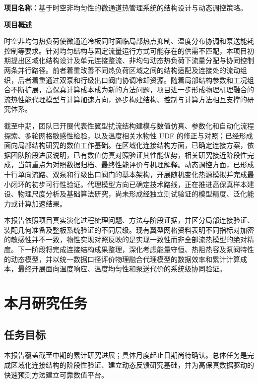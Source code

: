 \documentclass[stage2,UTF8,fontset=fandol]{ydzjreport}
\begin{document}
\makestagetwohead
\begin{keybox}
\textbf{项目名称：}基于时空非均匀性的微通道热管理系统的结构设计与动态调控策略。
\end{keybox}

\par\medskip
\noindent\textbf{项目概述}\par
时空非均匀热负荷使微通道冷板同时面临局部热点抑制、温度分布协调和泵送能耗控制等要求。针对均匀结构与固定流量运行方式可能存在的供需不匹配，本项目初期提出区域化结构设计及单元连接整流、非均匀动态热负荷下流量分配与协同控制两条并行路径。前者着重改善不同热负荷区域之间的结构适配及连接处的流动组织，后者着重通过双泵和行级出口阀门协调冷却资源。随着局部结构参数和工况组合不断扩展，高保真计算成本成为新的方法问题，项目进一步形成物理机理融合的流热性能代理模型与计算加速方向，逐步构建结构、控制与计算方法相互支撑的研究体系。

截至中期，团队已开展代表性翼型扰流结构建模与数值仿真、参数化和自动化流程探索、多轮网格敏感性检验，以及温度相关水物性 UDF 的修正与对照；已经形成面向局部结构研究的数值工作基础。在区域化连接结构方面，已确定连接方案，依据团队阶段进展说明，已有数值仿真对照验证其性能优势，相关研究接近阶段性完成，当前重点为对照数据归档、最终性能评价与机理解释。动态调控方面，已形成十行单向流路、双泵和行级出口阀门的基本架构，开展随机变化热源模拟并完成最小闭环的初步可行性验证。代理模型方向已确定技术路线，正在推进高保真样本建设、物理尺度分析及基础算法研究，尚未形成经独立测试验证的模型精度、泛化能力或计算加速结果。

本报告依照项目真实演化过程梳理问题、方法与阶段证据，并区分局部连接验证、装配几何准备及整板系统验证的不同层级。现有翼型网格资料表明不同指标对加密的敏感性并不一致，物性实现对照反映的是实现一致性而非全部流热模型的绝对精度。下一阶段将完成连接结构成果整理，深化考虑能量守恒、热阻热容及泵阀特性的动态模型，并以统一数据口径评价物理融合代理模型的数据效率和累计计算成本，最终开展面向温度响应、温度均匀性和泵送代价的系统级协同验证。

\section{本月研究任务}
\subsection{任务目标}
本报告覆盖截至中期的累计研究进展；具体月度起止日期尚待确认。总体任务是完成区域化连接结构的阶段性验证、建立动态反馈研究基础，并为高保真数据驱动的快速预测方法建立可靠数值平台。
\end{document}
